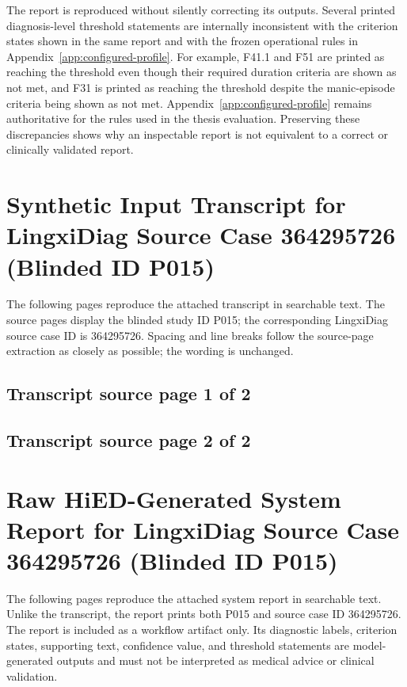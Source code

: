 \documentclass[12pt,a4paper,oneside]{report}
\begin{document}
The report is reproduced without silently correcting its outputs. Several
printed diagnosis-level threshold statements are internally inconsistent
with the criterion states shown in the same report and with the frozen
operational rules in Appendix~\ref{app:configured-profile}. For example,
F41.1 and F51 are printed as reaching the threshold even though their
required duration criteria are shown as not met, and F31 is printed as
reaching the threshold despite the manic-episode criteria being shown as
not met. Appendix~\ref{app:configured-profile} remains authoritative for
the rules used in the thesis evaluation. Preserving these discrepancies
shows why an inspectable report is not equivalent to a correct or
clinically validated report.

\section{Synthetic Input Transcript for LingxiDiag Source Case 364295726 (Blinded ID P015)}

The following pages reproduce the attached transcript in searchable text.
The source pages display the blinded study ID P015; the corresponding
LingxiDiag source case ID is 364295726. Spacing and line breaks follow the
source-page extraction as closely as possible; the wording is unchanged.

\subsection*{Transcript source page 1 of 2}
\clearpage
\subsection*{Transcript source page 2 of 2}
\clearpage

\section{Raw HiED-Generated System Report for LingxiDiag Source Case 364295726 (Blinded ID P015)}

The following pages reproduce the attached system report in searchable
text. Unlike the transcript, the report prints both P015 and source case ID
364295726. The report is included as a workflow artifact only. Its diagnostic
labels, criterion states, supporting text, confidence value, and threshold
statements are model-generated outputs and must not be interpreted as
medical advice or clinical validation.
\end{document}
